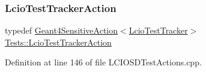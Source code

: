 \subsubsection{\texorpdfstring{Lcio\+Test\+Tracker\+Action}{LcioTestTrackerAction}}
{\footnotesize\ttfamily typedef \hyperlink{class_tests_1_1_geant4_sensitive_action}{Geant4\+Sensitive\+Action}$<$\hyperlink{class_tests_1_1_lcio_test_tracker}{Lcio\+Test\+Tracker}$>$ \hyperlink{namespace_tests_a2a7625ddf8e6d0dad5175dfc61402755}{Tests\+::\+Lcio\+Test\+Tracker\+Action}}



Definition at line 146 of file L\+C\+I\+O\+S\+D\+Test\+Actions.\+cpp.

